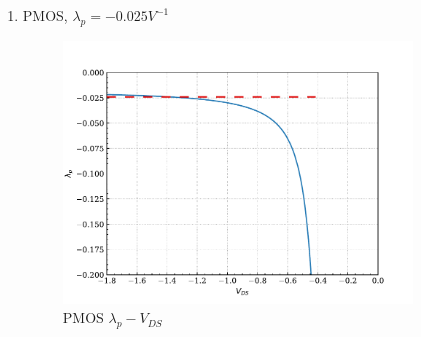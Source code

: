 \documentclass{article}
\begin{document}
\begin{enumerate}[(a)]
\begin{enumerate}[1.]
\item PMOS, \(\lambda_{p} = - 0.025 V^{-1}\)
\begin{figure}[H]
\centering
\includegraphics[width=350px]{img/q4/b/pmos-d-is-is.pdf}
\caption{\label{fig:nmos-d-is-is}PMOS \(\lambda_{p}-V_{DS}\)}
\end{figure}
\end{enumerate}
\end{enumerate}
\end{document}
